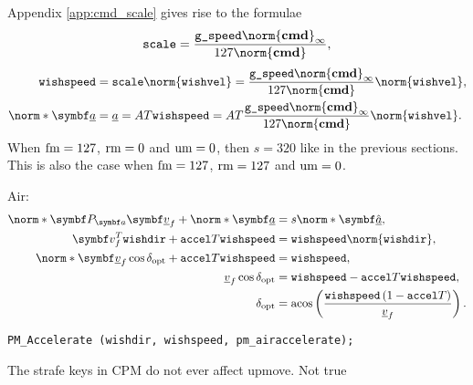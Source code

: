 Appendix \ref{app:cmd_scale} gives rise to the formulae
\begin{align}
\label{eq:scale}
\texttt{scale} = \frac{\texttt{g\_speed}\norm{\tvec{\cmd}}_{\infty}}{127\norm{\tvec{\cmd}}},
\end{align}
\begin{align*}
\texttt{wishspeed} &= \texttt{scale} \norm{\texttt{wishvel}} =
\frac{\texttt{g\_speed}\norm{\tvec{\cmd}}_{\infty}}{127\norm{\tvec{\cmd}}} \norm{\texttt{wishvel}},\\
\norm*{\vec{\flat{a}}} &= \flat{a} = AT \texttt{wishspeed} = AT\frac{\texttt{g\_speed}\norm{\tvec{\cmd}}_{\infty}}{127\norm{\tvec{\cmd}}} \norm{\texttt{wishvel}}.
\end{align*}
When $\operatorname{fm} = 127$, $\operatorname{rm} = 0$ and $\operatorname{um} = 0$, then $s = 320$ like in the previous sections.\\
This is also the case when $\operatorname{fm} = 127$, $\operatorname{rm} = 127$ and $\operatorname{um} = 0$.

Air:
\begin{align}
\nonumber
\norm*{\projmat{a} \vec{\flat{v}}_f} + \norm*{\vec{\flat{a}}} &= s \norm*{\uvec{\flat{a}}},\\
\nonumber
\vec{v}_{f}^T\texttt{wishdir} + \texttt{accel}T\texttt{wishspeed} &= \texttt{wishspeed}\norm{\texttt{wishdir}},\\
\nonumber
\norm*{\vec{\flat{v}}_f} \cos{\delta_{\opt}} + \texttt{accel}T\texttt{wishspeed} &= \texttt{wishspeed},\\
\nonumber
\flat{v}_f \cos{\delta_{\opt}} &= \texttt{wishspeed} - \texttt{accel}T\texttt{wishspeed},\\
\delta_{\opt} &= \acos\left( \frac{\texttt{wishspeed} \left(1 - \texttt{accel}T\right)}{\flat{v}_f} \right).
\end{align}

\texttt{PM\_Accelerate (wishdir, wishspeed, pm\_airaccelerate);}

The strafe keys in CPM do not ever affect upmove. Not true


